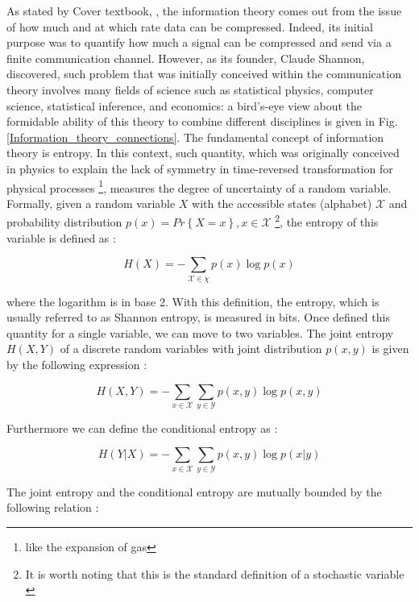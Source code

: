 \documentclass[12pt,%
               a4paper,%
               oneside,openany,%
               titlepage,%
               headinclude,footinclude,%
               BCOR5mm,%
               cleardoublepage=empty,%
               tablecaptionabove,%
               floatperchapter,
               ]{scrreprt}                 %
\begin{document}
As stated by Cover textbook, \cite{cover2006elements}, the information theory comes out from the issue of how much and at which rate data can be compressed. Indeed, its initial purpose was to quantify how much a signal can be compressed and send via a finite communication channel. However, as its founder, Claude Shannon, discovered, such problem that was initially conceived within the communication theory involves many fields of science such as statistical physics, computer science, statistical inference, and economics: a bird's-eye view about the formidable ability of this theory to combine different disciplines is given in Fig. \ref{Information_theory_connections}. The fundamental concept of information theory is entropy.  In this context,  such quantity,  which was originally conceived in physics to explain the lack of symmetry in time-reversed transformation for physical processes \footnote{like the expansion of gas},  measures the degree of uncertainty of a random variable. Formally, given a random variable $X$ with the accessible states (alphabet) $\mathcal{X}$ and probability distribution $p(x)= Pr\left\lbrace X=x\right\rbrace, x \in \mathcal{X} $ \footnote{It is worth noting that this is the standard definition of a stochastic variable \cite{van1992stochastic}}, the entropy of this variable is defined as \cite{cover2006elements}:

\begin{equation}
H(X)=-\sum_{\mathcal{X} \in \chi}p(x)\log p(x)
\end{equation}

where the logarithm is in base 2. With this definition, the entropy, which is usually referred to as Shannon entropy, is measured in bits. Once defined this quantity for a single variable, we can move to two variables. The joint entropy $H(X,Y)$ of a discrete random variables with joint distribution $p(x,y)$ is given by the following expression \cite{cover2006elements}:

\begin{equation}
H(X,Y)=-\sum_{x \in \mathcal{X}}\sum_{y \in \mathcal{Y}}p(x,y)\log p(x,y)
\end{equation}

Furthermore we can define the conditional entropy as \cite{cover2006elements}:

\begin{equation}
H(Y|X)=-\sum_{x \in \mathcal{X}}\sum_{y \in \mathcal{Y}}p(x,y)\log p(x|y)
\end{equation}

The joint entropy and the conditional entropy are mutually bounded by the following relation \cite{cover2006elements}:
\end{document}

